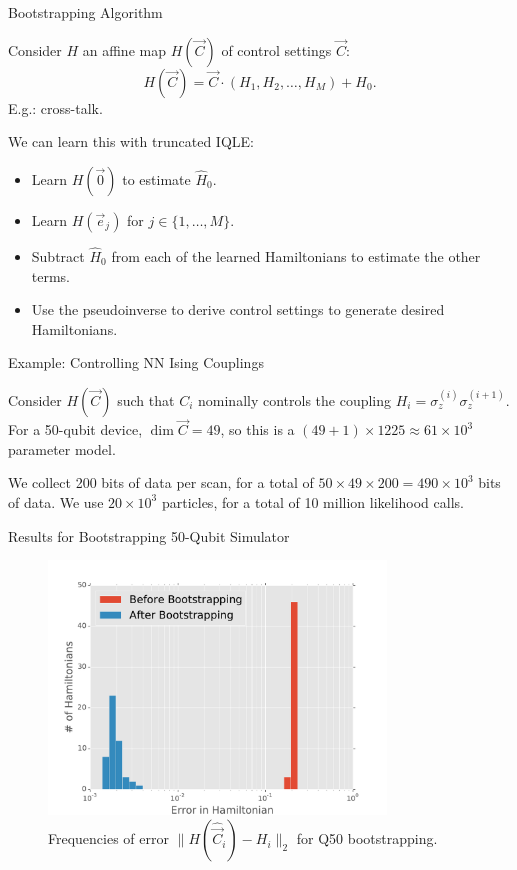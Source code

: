 \documentclass[xcolor=dvipsnames, compress]{beamer}
\begin{document}
\begin{frame}{Bootstrapping Algorithm}

  Consider $H$ an affine map $H(\vec{C})$ of control settings $\vec{C}$:
  \begin{equation}
      H(\vec{C}) = \vec{C} \cdot (H_1, H_2, \dots, H_M) + H_0.
  \end{equation}
  E.g.: cross-talk.

  We can learn this with truncated IQLE:
  \begin{itemize}
      \item Learn $H(\vec{0})$ to estimate $\hat{H}_0$.
      \item Learn $H(\vec{e}_j)$ for $j \in \{1, \dots, M\}$.
      \item Subtract $\hat{H}_0$ from each of the learned Hamiltonians
          to estimate the other terms.
      \item Use the pseudoinverse to derive control settings to generate
          desired Hamiltonians.
  \end{itemize}
\end{frame}

\begin{frame}{Example: Controlling NN Ising Couplings}
  
  Consider $H(\vec{C})$ such that $C_i$ nominally controls
  the coupling $H_i = \sigma_z^{(i)} \sigma_z^{(i + 1)}$. For a
  50-qubit device, $\dim\vec{C} = 49$, so this is a
  $(49 + 1) \times 1225 \approx 61 \times 10^3$ parameter model.

  \vspace{2em}

  We collect 200 bits of data per scan, for a total of
  $50 \times 49 \times 200 = 490 \times 10^3$ bits of data.
  We use $20\times 10^3$ particles, for a total of
  10 million likelihood calls.

\end{frame}

\begin{frame}{Results for Bootstrapping 50-Qubit Simulator}

  \begin{figure}
      \centering
      \includegraphics[width=0.8\textwidth]{figures/histplots_200}
      \caption{
        Frequencies of error $\|H(\hat{\vec{C}}_i) - H_i\|_2$ for Q50 bootstrapping.
      }
  \end{figure}

\end{frame}
\end{document}
